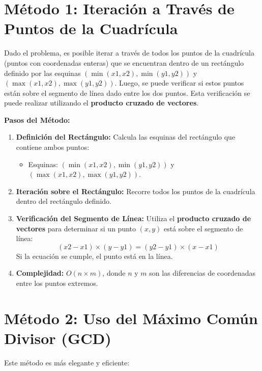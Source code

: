 
\section{Método 1: Iteración a Través de Puntos de la Cuadrícula}

Dado el problema, es posible iterar a través de todos los puntos de la cuadrícula (puntos con coordenadas enteras) que se encuentran dentro de un rectángulo definido por las esquinas $(\min(x1, x2), \min(y1, y2))$ y $(\max(x1, x2), \max(y1, y2))$. Luego, se puede verificar si estos puntos están sobre el segmento de línea dado entre los dos puntos. Esta verificación se puede realizar utilizando el \textbf{producto cruzado de vectores}.

\textbf{Pasos del Método:}
\begin{enumerate}
    \item \textbf{Definición del Rectángulo:} Calcula las esquinas del rectángulo que contiene ambos puntos:
    \begin{itemize}
        \item Esquinas: $(\min(x1, x2), \min(y1, y2))$ y $(\max(x1, x2), \max(y1, y2))$.
    \end{itemize}
    
    \item \textbf{Iteración sobre el Rectángulo:} Recorre todos los puntos de la cuadrícula dentro del rectángulo definido.
    
    \item \textbf{Verificación del Segmento de Línea:} Utiliza el \textbf{producto cruzado de vectores} para determinar si un punto $(x, y)$ está sobre el segmento de línea:
    \[
    (x2 - x1) \times (y - y1) = (y2 - y1) \times (x - x1)
    \]
    Si la ecuación se cumple, el punto está en la línea.

    \item \textbf{Complejidad:} $O(n \times m)$, donde $n$ y $m$ son las diferencias de coordenadas entre los puntos extremos.
\end{enumerate}

\section{Método 2: Uso del Máximo Común Divisor (GCD)}

Este método es más elegante y eficiente:

